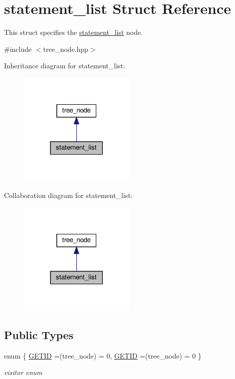 \hypertarget{structstatement__list}{}\section{statement\+\_\+list Struct Reference}
\label{structstatement__list}


This struct specifies the \hyperlink{structstatement__list}{statement\+\_\+list} node.  




{\ttfamily \#include $<$tree\+\_\+node.\+hpp$>$}



Inheritance diagram for statement\+\_\+list\+:
\nopagebreak
\begin{figure}[H]
\begin{center}
\leavevmode
\includegraphics[width=158pt]{d8/de8/structstatement__list__inherit__graph}
\end{center}
\end{figure}


Collaboration diagram for statement\+\_\+list\+:
\nopagebreak
\begin{figure}[H]
\begin{center}
\leavevmode
\includegraphics[width=158pt]{d3/ddd/structstatement__list__coll__graph}
\end{center}
\end{figure}
\subsection*{Public Types}
\begin{DoxyCompactItemize}
\item 
enum \{ \hyperlink{structstatement__list_a8dc15b7860102231c0bc499608d6331aa69aba83ab9336aa292e78f4a752677ad}{G\+E\+T\+ID} =(tree\+\_\+node) = 0, 
\hyperlink{structstatement__list_a8dc15b7860102231c0bc499608d6331aa69aba83ab9336aa292e78f4a752677ad}{G\+E\+T\+ID} =(tree\+\_\+node) = 0
 \}\begin{DoxyCompactList}\small\item\em visitor enum \end{DoxyCompactList}
\end{DoxyCompactItemize}
